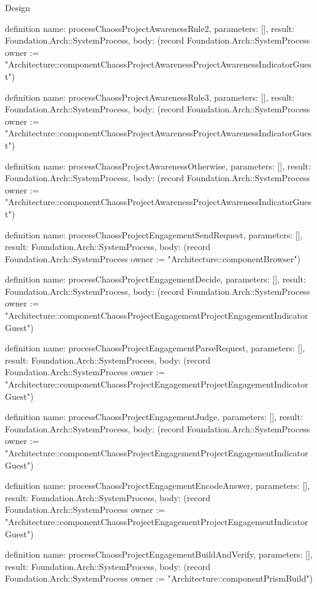 \begin{lexlean}{Design}
\begin{semanticmodule}
definition{
  name: processChaossProjectAwarenessRule2,
  parameters: [],
  result: Foundation.Arch::SystemProcess,
  body: (record Foundation.Arch::SystemProcess {owner := "Architecture::componentChaossProjectAwarenessProjectAwarenessIndicatorGuest"})
}

definition{
  name: processChaossProjectAwarenessRule3,
  parameters: [],
  result: Foundation.Arch::SystemProcess,
  body: (record Foundation.Arch::SystemProcess {owner := "Architecture::componentChaossProjectAwarenessProjectAwarenessIndicatorGuest"})
}

definition{
  name: processChaossProjectAwarenessOtherwise,
  parameters: [],
  result: Foundation.Arch::SystemProcess,
  body: (record Foundation.Arch::SystemProcess {owner := "Architecture::componentChaossProjectAwarenessProjectAwarenessIndicatorGuest"})
}

definition{
  name: processChaossProjectEngagementSendRequest,
  parameters: [],
  result: Foundation.Arch::SystemProcess,
  body: (record Foundation.Arch::SystemProcess {owner := "Architecture::componentBrowser"})
}

definition{
  name: processChaossProjectEngagementDecide,
  parameters: [],
  result: Foundation.Arch::SystemProcess,
  body: (record Foundation.Arch::SystemProcess {owner := "Architecture::componentChaossProjectEngagementProjectEngagementIndicatorGuest"})
}

definition{
  name: processChaossProjectEngagementParseRequest,
  parameters: [],
  result: Foundation.Arch::SystemProcess,
  body: (record Foundation.Arch::SystemProcess {owner := "Architecture::componentChaossProjectEngagementProjectEngagementIndicatorGuest"})
}

definition{
  name: processChaossProjectEngagementJudge,
  parameters: [],
  result: Foundation.Arch::SystemProcess,
  body: (record Foundation.Arch::SystemProcess {owner := "Architecture::componentChaossProjectEngagementProjectEngagementIndicatorGuest"})
}

definition{
  name: processChaossProjectEngagementEncodeAnswer,
  parameters: [],
  result: Foundation.Arch::SystemProcess,
  body: (record Foundation.Arch::SystemProcess {owner := "Architecture::componentChaossProjectEngagementProjectEngagementIndicatorGuest"})
}

definition{
  name: processChaossProjectEngagementBuildAndVerify,
  parameters: [],
  result: Foundation.Arch::SystemProcess,
  body: (record Foundation.Arch::SystemProcess {owner := "Architecture::componentPrismBuild"})
}


\end{semanticmodule}
\end{lexlean}
